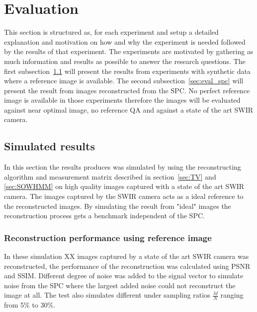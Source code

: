 \section{Evaluation}
\label{sec:Evaluation}
This section is structured as, for each experiment and setup a detailed explanation and motivation on how and why the experiment is needed followed by the results of that experiment. The experiments are motivated by gathering as much information and results as possible to answer the research questions. The first subsection~\ref{sec:simulated_results} will present the results from experiments with synthetic data where a reference image is available. The second subsection~\ref{sec:eval_spc} will present the result from images reconstructed from the SPC. No perfect reference image is available in those experiments therefore the images will be evaluated against near optimal image, no reference QA and against a state of the art SWIR camera. 



\subsection{Simulated results}
\label{sec:simulated_results}
In this section the results produces was simulated by using the reconstructing algorithm and measurement matrix described in section~\ref{sec:TV} and \ref{sec:SOWHMM} on high quality images captured with a state of the art SWIR camera. The images captured by the SWIR camera acts as a ideal reference to the reconstructed images. By simulating the result from "ideal" images the reconstruction process gets a benchmark independent of the SPC.


\subsubsection{Reconstruction performance using reference image}
\label{sec:reconstruction_performance}
In these simulation XX images captured by a state of the art SWIR camera was reconstructed, the performance of the reconstruction was calculated using PSNR and SSIM. Different degree of noise was added to the signal vector to simulate noise from the SPC where the largest added noise could not reconstruct the image at all. The test also simulates different under sampling ratios $\frac{M}{N}$ ranging from 5\% to 30\%. 


